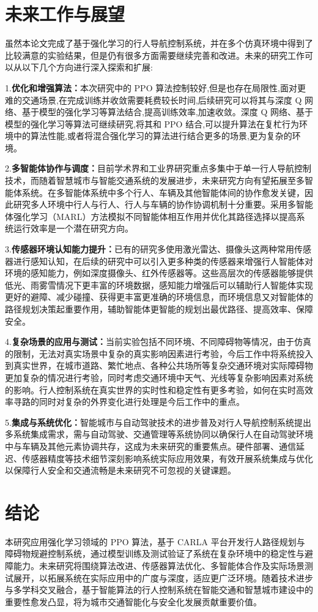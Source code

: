\section{未来工作与展望}

虽然本论文完成了基于强化学习的行人导航控制系统，并在多个仿真环境中得到了比较满意的实验结果，但是仍有很多方面需要继续完善和改进。未来的研究工作可以从以下几个方向进行深入探索和扩展:

1.\textbf{优化和增强算法：}本次研究中的 PPO 算法控制较好,但是也存在局限性,面对更难的交通场景,在完成训练并收敛需要耗费较长时间,后续研究可以将其与深度 Q 网络、基于模型的强化学习等算法结合,提高训练效率,加速收敛。深度 Q 网络、基于模型的强化学习等算法可继续研究,将其和 PPO 结合,可以提升算法在复杧行为环境中的算法性能,或者将混合强化学习的算法进行结合更多的场景,更为复杂的环境。

2.\textbf{多智能体协作与调度：}目前学术界和工业界研究重点多集中于单一行人导航控制技术，而随着智慧城市与智能交通系统的发展进步，未来研究方向有望拓展至多智能体系统。在多智能体系统中多个行人、车辆及其他智能体间的协作愈发关键，因此研究多人环境中行人与行人、行人与车辆的协作协调机制十分重要。采用多智能体强化学习（MARL）方法模拟不同智能体相互作用并优化其路径选择以提高系统运行效率是一个潜在研究方向。

3.\textbf{传感器环境认知能力提升：}已有的研究多使用激光雷达、摄像头这两种常用传感器进行感知认知，在后续的研究中可以引入更多种类的传感器来增强行人智能体对环境的感知能力，例如深度摄像头、红外传感器等。这些高层次的传感器能够提供低光、雨雾雪情况下更丰富的环境数据，感知能力增强后可以辅助行人智能体实现更好的避障、减少碰撞、获得更丰富更准确的环境信息，而环境信息又对智能体的路径规划决策起重要作用，辅助智能体更智能的规划出最优路径、提高效率、保障安全。

4.\textbf{复杂场景的应用与测试：}当前实验包括不同环境、不同障碍物等情况，由于仿真的限制，无法对真实场景中复杂的真实影响因素进行考验，今后工作中将系统投入到真实世界，在城市道路、繁忙地点、各种公共场所等复杂交通环境对实际障碍物更加复杂的情况进行考验，同时考虑交通环境中天气、光线等复杂影响因素对系统的影响。行人控制系统在真实世界的实时性和稳定性有更多考验，如何在实时高效率寻路的同时对复杂的外界变化进行处理是今后工作中的重点。

5.\textbf{集成与系统优化：}智能城市与自动驾驶技术的进步普及对行人导航控制系统提出多系统集成需求，需与自动驾驶、交通管理等系统协同以确保行人在自动驾驶环境中与车辆及其他元素协调共存，这成为未来研究的重要焦点。硬件部署、通信延迟、传感器精度等技术细节深刻影响系统实际应用效果，有效开展系统集成与优化以保障行人安全和交通流畅是未来研究不可忽视的关键课题。

\section{结论}

本研究应用强化学习领域的 PPO 算法，基于 CARLA 平台开发行人路径规划与障碍物规避控制系统，通过模型训练及测试验证了系统在复杂环境中的稳定性与避障能力。未来研究将围绕算法改进、传感器算法优化、多智能体合作及实际场景测试展开，以拓展系统在实际应用中的广度与深度，适应更广泛环境。随着技术进步与多学科交叉融合，基于智能算法的行人控制系统在智能交通和智慧城市建设中的重要性愈发凸显，将为城市交通智能化与安全化发展贡献重要价值。​